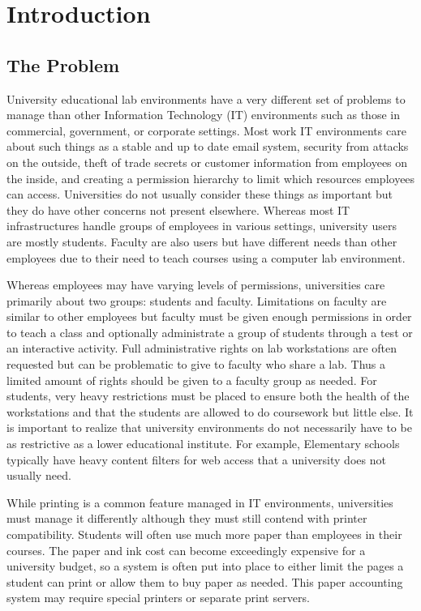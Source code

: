 \chapter{Introduction} \label{ch:introduction}
\section{The Problem} \label{sec:the_problem}
University educational lab environments have a very different set of problems to manage than other Information Technology (IT) environments such as those in commercial, government, or corporate settings.  Most work IT environments care about such things as a stable and up to date email system, security from attacks on the outside, theft of trade secrets or customer information from employees on the inside, and creating a permission hierarchy to limit which resources employees can access.  Universities do not usually consider these things as important but they do have other concerns not present elsewhere.  Whereas most IT infrastructures handle groups of employees in various settings, university users are mostly students.  Faculty are also users but have different needs than other employees due to their need to teach courses using a computer lab environment.  

Whereas employees may have varying levels of permissions, universities care primarily about two groups:  students and faculty.  Limitations on faculty are similar to other employees but faculty must be given enough permissions in order to teach a class and optionally administrate a group of students through a test or an interactive activity.  Full administrative rights on lab workstations are often requested but can be problematic to give to faculty who share a lab.  Thus a limited amount of rights should be given to a faculty group as needed.  For students, very heavy restrictions must be placed to ensure both the health of the workstations and that the students are allowed to do coursework but little else.  It is important to realize that university environments do not necessarily have to be as restrictive as a lower educational institute.  For example, Elementary schools typically have heavy content filters for web access that a university does not usually need.

While printing is a common feature managed in IT environments, universities must manage it differently although they must still contend with printer compatibility.  Students will often use much more paper than employees in their courses.  The paper and ink cost can become exceedingly expensive for a university budget, so a system is often put into place to either limit the pages a student can print or allow them to buy paper as needed.  This paper accounting system may require special printers or separate print servers.  

